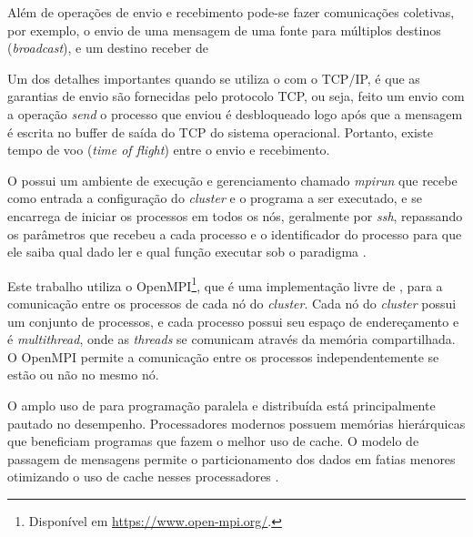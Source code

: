 
Além de operações de envio e recebimento pode-se fazer comunicações coletivas,
por exemplo, o envio de uma mensagem de uma fonte para múltiplos destinos
(\emph{broadcast}), e um destino receber de



Um dos detalhes importantes quando se utiliza o \mpi com o TCP/IP, é que as
garantias de envio são fornecidas pelo protocolo TCP, ou seja, feito um envio
com a operação \emph{send} o processo que enviou é desbloqueado logo após que a
mensagem é escrita no buffer de saída do TCP do sistema operacional. Portanto,
existe tempo de voo (\emph{time of flight}) entre o envio e recebimento.

O \mpi possui um ambiente de execução e gerenciamento chamado \emph{mpirun} que
recebe como entrada a configuração do \emph{cluster} e o programa a ser executado, e se
encarrega de iniciar os processos em todos os nós, geralmente por \emph{ssh},
repassando os parâmetros que recebeu a cada processo e o identificador do
processo para que ele saiba qual dado ler e qual função executar sob o paradigma
\spmd.

Este trabalho utiliza o OpenMPI\footnote{Disponível em
\url{https://www.open-mpi.org/}.}, que é uma implementação livre de \mpi, para a
comunicação entre os processos de cada nó do \emph{cluster}.
Cada nó do \emph{cluster} possui um conjunto de processos, e cada processo possui seu
espaço de endereçamento e é \emph{multithread}, onde as \emph{threads} se comunicam
através da memória compartilhada.
O OpenMPI permite a comunicação entre os processos independentemente se estão ou não
no mesmo nó.



O amplo uso de \mpi para programação paralela e distribuída está principalmente
pautado no desempenho.
Processadores modernos possuem memórias hierárquicas que beneficiam programas
que fazem o melhor uso de cache.
O modelo de passagem de mensagens permite o particionamento dos dados em fatias
menores otimizando o uso de cache nesses processadores \cite{MpiMitBookGroupp2014}.

